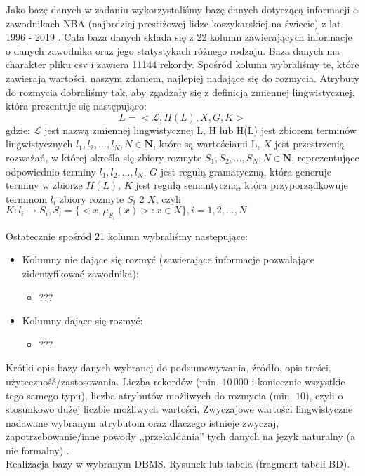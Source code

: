 \documentclass{classrep}
\begin{document}
Jako bazę danych w zadaniu wykorzystaliśmy bazę danych dotyczącą informacji o zawodnikach NBA (najbrdziej prestiżowej lidze koszykarskiej na świecie) z lat 1996 - 2019 \cite{baza_NBA}. Cała baza danych składa się z 22 kolumn zawierających informacje o danych zawodnika oraz jego statystykach różnego rodzaju. Baza danych ma charakter pliku csv i zawiera 11144 rekordy. Spośród kolumn wybraliśmy te, które zawierają wartości, naszym zdaniem, najlepiej nadające się do rozmycia. Atrybuty do rozmycia dobraliśmy tak, aby zgadzały się z definicją zmiennej lingwistycznej, która prezentuje się następująco: 
\begin{equation}
    L=<\mathcal{L}, H(L), X, G, K>
\end{equation}
gdzie: \newline $\mathcal{L}$ jest nazwą zmiennej lingwistycznej L, \newline H lub H(L) jest zbiorem terminów lingwistycznych $l_1, l_2, ..., l_N, N \in \mathbf{N}$, które są wartościami L, \newline $X$ jest przestrzenią rozważań, w której określa się zbiory rozmyte $S_1, S_2,..., S_N, N \in \mathbf{N}$, reprezentujące odpowiednio terminy $l_1, l_2, ..., l_N$, \newline $G$ jest regułą gramatyczną, która generuje terminy w zbiorze $H(L)$, \newline $K$ jest regułą semantyczną, która przyporządkowuje terminom $l_i$ zbiory rozmyte $S_i$ 2 $X$, czyli $K : l_i \rightarrow S_i, S_i = \{<x,\mu_{S_i}(x)> : x \in X \}, i = 1,2,...,N$

Ostatecznie spośród 21 kolumn wybraliśmy następujące:
\begin{itemize}
    \item Kolumny nie dające się rozmyć (zawierające informacje pozwalające zidentyfikować zawodnika):
    \begin{itemize}
        \item ???
    \end{itemize}
    \item Kolumny dające się rozmyć:
    \begin{itemize}
        \item ???
    \end{itemize}
\end{itemize}
Krótki opis bazy danych wybranej do podsumowywania, źródło, opis treści,
użyteczność/zastosowania. Liczba rekordów (min. $10\,000$ i koniecznie wszystkie tego
samego typu), liczba atrybutów możliwych do rozmycia (min. $10$), czyli o stosunkowo dużej
liczbie możliwych wartości. Zwyczajowe wartości lingwistyczne nadawane wybranym
atrybutom oraz dlaczego istnieje zwyczaj, zapotrzebowanie/inne powody
,,przekałdania'' tych danych na język
naturalny (a nie formalny) \cite{niewiadomski19, niewiadomski08}.\\
Realizacja bazy w wybranym DBMS. Rysunek lub tabela (fragment tabeli BD).\\ 
\end{document}
